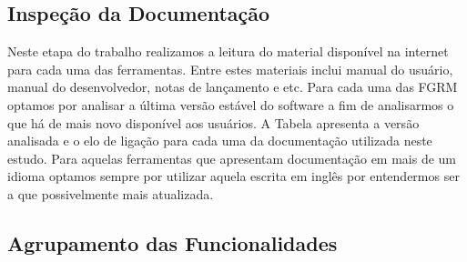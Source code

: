 \begin{table}[ht]
	\centering
	\caption{Ferramentas e serviços da Internet selecionados.}
	\label{tab:ferramentas_selecionadas}
\end{table}

\subsection{Inspeção da Documentação}
\label{ssub:Inspeção da Documentação}

Neste etapa do trabalho realizamos a leitura do material disponível na internet para cada uma das
ferramentas. Entre estes materiais inclui manual do usuário, manual do desenvolvedor, notas de
lançamento e etc. Para cada uma das FGRM optamos por analisar a última versão estável do software a
fim de analisarmos o que há de mais novo disponível aos usuários. A Tabela apresenta a versão
analisada e o elo de ligação para cada uma da documentação utilizada neste estudo. Para aquelas
ferramentas que apresentam documentação em mais de um idioma optamos sempre por utilizar aquela
escrita em inglês por entendermos ser a que possivelmente mais atualizada.

\subsection{Agrupamento das Funcionalidades}
\label{ssub:Agrupamento das Funcionalidades}

